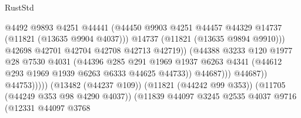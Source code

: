 \begin{lexlean}{RustStd}
\begin{coremodule}
                                                  @4492
                                                  @9893
                                                  @4251
                                                  @44441
                                                  (@44450
                                                    @9903
                                                    @4251
                                                    @44457
                                                    @44329
                                                    @14737
                                                    (@11821 (@13635 @9904 @4037)))
                                                  @14737
                                                  (@11821 (@13635 @9894 @9910)))
                                                @42698
                                                @42701
                                                @42704
                                                @42708
                                                @42713
                                                @42719))
                                            (@44388
                                              @3233
                                              @120
                                              @1977
                                              @28
                                              @7530
                                              @4031
                                              (@44396
                                                @285
                                                @291
                                                @1969
                                                @1937
                                                @6263
                                                @4341
                                                (@44612 @293 @1969 @1939 @6263 @6333 @44625 @44733))
                                              @44687)))
                                        @44687))
                                    @44753)))))
                          (@13482 (@44237 @109))
                          (@11821 (@44242 @99 @353))
                          (@11705 (@44249 @353 @98 @4290 @4037))
                          (@11839
                            @44097
                            @3245
                            @2535
                            @4037
                            @9716
                            (@12331
                              @44097
                              @3768

\end{coremodule}
\end{lexlean}
